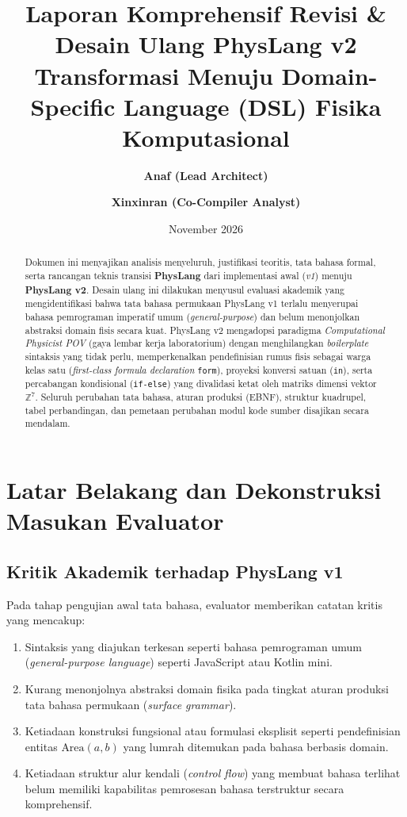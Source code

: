 \documentclass[11pt,a4paper]{article}
\title{\textbf{\LARGE Laporan Komprehensif Revisi \& Desain Ulang PhysLang v2}\\[0.3em]
\Large Transformasi Menuju Domain-Specific Language (DSL) Fisika Komputasional}
\author{\textbf{Anaf (Lead Architect)} \and \textbf{Xinxinran (Co-Compiler Analyst)}}
\date{November 2026}
\begin{document}
\maketitle
\begin{abstract}
Dokumen ini menyajikan analisis menyeluruh, justifikasi teoritis, tata bahasa formal, serta rancangan teknis transisi \textbf{PhysLang} dari implementasi awal (\textit{v1}) menuju \textbf{PhysLang v2}. Desain ulang ini dilakukan menyusul evaluasi akademik yang mengidentifikasi bahwa tata bahasa permukaan PhysLang v1 terlalu menyerupai bahasa pemrograman imperatif umum (\textit{general-purpose}) dan belum menonjolkan abstraksi domain fisis secara kuat. PhysLang v2 mengadopsi paradigma \textit{Computational Physicist POV} (gaya lembar kerja laboratorium) dengan menghilangkan \textit{boilerplate} sintaksis yang tidak perlu, memperkenalkan pendefinisian rumus fisis sebagai warga kelas satu (\textit{first-class formula declaration} \texttt{form}), proyeksi konversi satuan (\texttt{in}), serta percabangan kondisional (\texttt{if-else}) yang divalidasi ketat oleh matriks dimensi vektor $\mathbb{Z}^7$. Seluruh perubahan tata bahasa, aturan produksi (EBNF), struktur kuadrupel, tabel perbandingan, dan pemetaan perubahan modul kode sumber disajikan secara mendalam.
\end{abstract}

\tableofcontents
\newpage

\section{Latar Belakang dan Dekonstruksi Masukan Evaluator}

\subsection{Kritik Akademik terhadap PhysLang v1}
Pada tahap pengujian awal tata bahasa, evaluator memberikan catatan kritis yang mencakup:
\begin{enumerate}[noitemsep]
    \item Sintaksis yang diajukan terkesan seperti bahasa pemrograman umum (\textit{general-purpose language}) seperti JavaScript atau Kotlin mini.
    \item Kurang menonjolnya abstraksi domain fisika pada tingkat aturan produksi tata bahasa permukaan (\textit{surface grammar}).
    \item Ketiadaan konstruksi fungsional atau formulasi eksplisit seperti pendefinisian entitas $\text{Area}(a, b)$ yang lumrah ditemukan pada bahasa berbasis domain.
    \item Ketiadaan struktur alur kendali (\textit{control flow}) yang membuat bahasa terlihat belum memiliki kapabilitas pemrosesan bahasa terstruktur secara komprehensif.
\end{enumerate}
\end{document}
